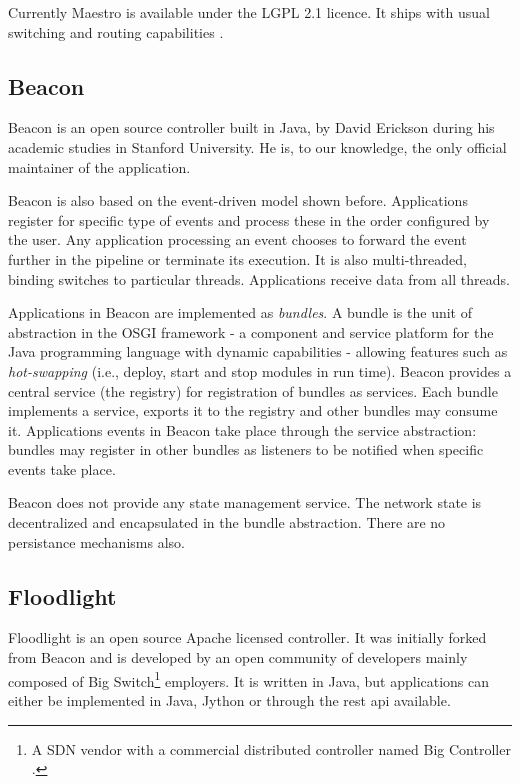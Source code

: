 Currently Maestro is available under the LGPL 2.1 licence. It ships with usual switching  and routing capabilities \cite{maestro}.


\subsection{Beacon}
\label{sec:related:beacon}


Beacon is an open source controller built in Java, by David Erickson during his academic studies in Stanford University. 
He is, to our knowledge, the only official maintainer of the
application. 

Beacon is also based on the event-driven model shown before. Applications register for
specific type of events and process these  in the order
configured by the user. Any application processing an event chooses to forward the
event further in the pipeline or terminate its execution. It is also
multi-threaded, binding switches to particular threads.
Applications receive data from all threads.

Applications in Beacon are implemented as \emph{bundles}. 
A bundle is the unit of abstraction in the OSGI \cite{osgi} framework - a component and service platform for the Java programming language with dynamic capabilities - allowing features such as \emph{hot-swapping} (i.e., deploy, start and stop modules in run time). 
Beacon provides a central service (the registry) for registration of bundles as services. 
Each bundle implements a service, exports it to the registry and other bundles may consume it. 
Applications events in Beacon take place through the service abstraction: bundles may register in other bundles as listeners to be notified when specific events take place. 

Beacon does not provide any state management service. The network state is decentralized and encapsulated in the bundle abstraction. There are no persistance  mechanisms also. 

\subsection{Floodlight}
\label{sec:related:floodlight}
Floodlight is an open source Apache licensed controller.
 It was initially forked from Beacon and is developed by an open community of developers mainly composed of Big Switch\footnote{A SDN vendor with a commercial distributed controller named Big Controller \cite{:vn}.} employers. 
It is written in Java, but applications can either be implemented in Java, Jython or through the \gls{rest} \gls{api}  available. 

